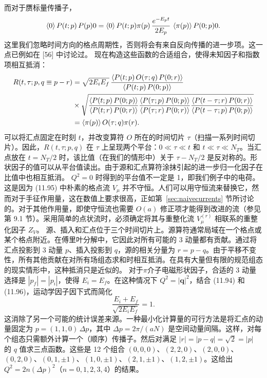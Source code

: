 而对于赝标量传播子，
\begin{equation}
\left\langle 0 \right\rangle{P(t; p)\, P(p)}{0}
= \left\langle 0 \right\rangle{P(t; p)}{\pi(p)}\,
\frac{e^{-E_p t}}{2E_p}\,
\left\langle \pi(p) \right\rangle{P(0; p)}{0} .
\end{equation}
这里我们忽略时间方向的格点周期性，否则将会有来自反向传播的进一步项。这一点已例如在 [56] 中讨论过。
现在构造这些函数的合适组合，使得未知因子和指数项相互抵消：
\begin{equation}
\begin{aligned}
R(t, \tau; p, q \equiv p - r)
&= \sqrt{2E_iE_f}\,
\frac{\left\langle P(t; p)\, O(\tau; q)\, P(0; r) \right\rangle}{\left\langle P(t; p)\, P(0; p) \right\rangle} \\
&\times
\sqrt{
  \frac{\left\langle P(t; p)\, P(0; p) \right\rangle}{\left\langle P(t; r)\, P(0; r) \right\rangle}
  \frac{\left\langle P(\tau; p)\, P(0; p) \right\rangle}{\left\langle P(\tau; r)\, P(0; r) \right\rangle}
  \frac{\left\langle P(t - \tau; r)\, P(0; r) \right\rangle}{\left\langle P(t - \tau; p)\, P(0; p) \right\rangle}} \\
&= \left\langle \pi(p) \right\rangle{O(\tau; q)}{\pi(r)} .
\end{aligned}
\end{equation}
可以将汇点固定在时刻 $t$，并改变算符 $O$ 所在的时间切片 $\tau$（扫描一系列时间切片）。因此，$R(t, \tau; p, q)$ 在 $\tau$ 上呈现两个平台：$0 \ll \tau \ll t$ 和 $t \ll \tau \ll N_T$。当汇点放在 $t = N_T/2$ 时，该比值（在我们的情形中）关于 $\tau - N_T/2$ 是反对称的。形状因子的值可以从平台值读出。由于源和汇点算符涂抹引起的进一步归一化因子在比值中也相互抵消。
$Q^2 = 0$ 时得到的平台值不一定是 1，即我们例子中的电荷。这是因为 (11.95) 中朴素的格点流 $V_\mu$ 并不守恒。人们可以用守恒流来替换它，然而对于手征作用量，这在数值上要求很高，正如第~\ref{sec:naivecurrents} 节所讨论的。对于其他作用量，即使守恒流也需要 $O(a)$ 修正项才能得到改进的流（参见第 9.1 节）。采用简单的点状流时，必须确定将其与重整化流 $V_\mu^{(r)}$ 相联系的重整化因子 $Z_V$。
源、插入和汇点位于三个时间切片上。源算符通常局域在一个格点或某个格点附近。在傅里叶分解中，它因此对所有可能的 3 动量都有贡献。通过将汇点投影到 3 动量 $p$、插入投影到 $q$，源的相关分量为 $r = p - q$。由于平移不变性，所有其他贡献在对所有场组态求和时相互抵消。在具有大量但有限的规范组态的现实情形中，这种抵消只是近似的。
对于$\pi$介子电磁形状因子，合适的 3 动量选择是 $|p_f| = |p_i|$，使得 $E_i = E_f$。在这种情况下 $Q^2 = |\mathbf{q}|^2$，结合 (11.94) 和 (11.96)，运动学因子因下式而简化
\begin{equation}
\frac{E_i + E_f}{\sqrt{2E_iE_f}} = 1 .
\end{equation}
这消除了另一个可能的统计误差来源。一种最小化计算量的可行方法是将汇点的动量固定为 $p = (1, 1, 0)\,\Delta p$，其中 $\Delta p = 2\pi/(aN)$ 是空间动量间隔。这样，对每个组态只需额外计算一个（顺序）传播子。然后对满足 $|r| = |p - q| = \sqrt{2} = |p|$ 的 $q$ 值求三点函数。这些是 12 个组合 $(0, 0, 0)$、$(2, 2, 0)$、$(2, 0, 0)$、$(0, 2, 0)$、$(0, 1, \pm 1)$、$(1, 0, \pm 1)$、$(2, 1, \pm 1)$、$(1, 2, \pm 1)$。这给出 $Q^2 = 2n(\Delta p)^2$（$n = 0, 1, 2, 3, 4$）的结果。

